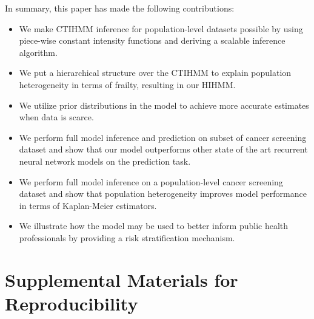 \documentclass{article}
\begin{document}
In summary, this paper has made the following contributions:
\begin{itemize}
	\item We make CTIHMM inference for population-level datasets possible by using piece-wise constant intensity functions and deriving a scalable inference algorithm.
	\item We put a hierarchical structure over the CTIHMM to explain population heterogeneity in terms of frailty, resulting in our HIHMM.
	\item We utilize prior distributions in the model to achieve more accurate estimates when data is scarce.    
	\item We perform full model inference and prediction on subset of cancer screening dataset and show that our model outperforms other state of the art recurrent neural network models on the prediction task.
	\item We perform full model inference on a population-level cancer screening dataset and show that population heterogeneity improves model performance in terms of Kaplan-Meier estimators. 
	\item We illustrate how the model may be used to better inform public health professionals by providing a risk stratification mechanism. 
\end{itemize}


\newpage



\newpage
\appendix
\section{Supplemental Materials for Reproducibility}
\end{document}
